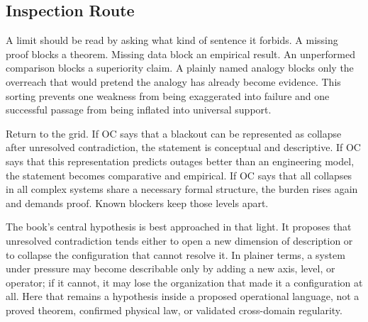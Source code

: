 \documentclass[11pt,a4paper,openany]{book}
\begin{document}
\subsection{Inspection Route}
A limit should be read by asking what kind of sentence it forbids. A missing proof blocks a theorem. Missing data block an empirical result. An unperformed comparison blocks a superiority claim. A plainly named analogy blocks only the overreach that would pretend the analogy has already become evidence. This sorting prevents one weakness from being exaggerated into failure and one successful passage from being inflated into universal support. \cite{wilson_renormalization,landau_stat_physics}\par
Return to the grid. If OC says that a blackout can be represented as collapse after unresolved contradiction, the statement is conceptual and descriptive. If OC says that this representation predicts outages better than an engineering model, the statement becomes comparative and empirical. If OC says that all collapses in all complex systems share a necessary formal structure, the burden rises again and demands proof. Known blockers keep those levels apart.\par
The book's central hypothesis is best approached in that light. It proposes that unresolved contradiction tends either to open a new dimension of description or to collapse the configuration that cannot resolve it. In plainer terms, a system under pressure may become describable only by adding a new axis, level, or operator; if it cannot, it may lose the organization that made it a configuration at all. Here that remains a hypothesis inside a proposed operational language, not a proved theorem, confirmed physical law, or validated cross-domain regularity.\par
\end{document}
